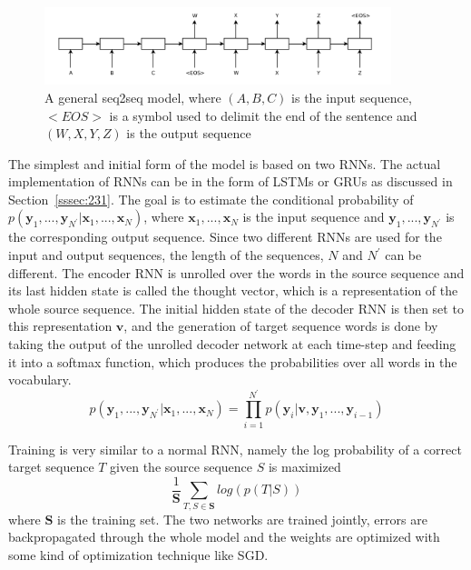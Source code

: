 \documentclass[12pt]{article}
\begin{document}
\begin{figure}[H]
	\label{fig:232a}
	\centering
	\includegraphics[width=0.9\textwidth]{pics/seq2seq.png}
	\caption{A general seq2seq model, where \((A,B,C)\) is the input sequence, \(<EOS>\) is a symbol used to delimit the end of the sentence and \((W,X,Y,Z)\) is the output sequence \cite{Sutskever:2014}}
\end{figure}

The simplest and initial form of the model is based on two RNNs. The actual implementation of RNNs can be in the form of LSTMs or GRUs as discussed in Section~\ref{sssec:231}. The goal is to estimate the conditional probability of \(p(\bm{y}_1,...,\bm{y}_{N^{'}}|\bm{x}_1,...,\bm{x}_N)\), where \(\bm{x}_1,...,\bm{x}_N\) is the input sequence and \(\bm{y}_1,...,\bm{y}_{N^{'}}\) is the corresponding output sequence. Since two different RNNs are used for the input and output sequences, the length of the sequences, \(N\) and \(N^{'}\) can be different. The encoder RNN is unrolled over the words in the source sequence and its last hidden state is called the thought vector, which is a representation of the whole source sequence. The initial hidden state of the decoder RNN is then set to this representation \(\bm{v}\), and the generation of target sequence words is done by taking the output of the unrolled decoder network at each time-step and feeding it into a softmax function, which produces the probabilities over all words in the vocabulary.
\begin{equation} \label{eq232a}
p(\bm{y}_1,...,\bm{y}_{N^{'}}|\bm{x}_1,...,\bm{x}_N)=\prod_{i=1}^{N^{'}}p(\bm{y}_i|\bm{v},\bm{y}_1,...,\bm{y}_{i-1})
\end{equation}

Training is very similar to a normal RNN, namely the log probability of a correct target sequence \(T\) given the source sequence \(S\) is maximized
\begin{equation} \label{eq232b}
\frac{1}{\bm{S}}\sum_{T,S \in \bm{S}}log(p(T|S))
\end{equation}
where \(\bm{S}\) is the training set. The two networks are trained jointly, errors are backpropagated through the whole model and the weights are optimized with some kind of optimization technique like SGD.
\end{document}
